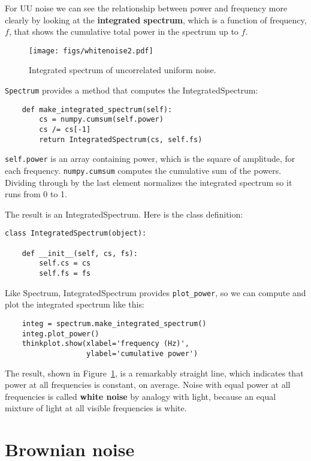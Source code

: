 \documentclass[12pt]{book}
\begin{document}
For UU noise we can see the relationship between power and frequency
more clearly by looking at the {\bf integrated spectrum}, which
is a function of frequency, $f$, that shows the cumulative total power in
the spectrum up to $f$.

\begin{figure}
\centerline{\texttt{[image: figs/whitenoise2.pdf]}}
\caption{Integrated spectrum of uncorrelated uniform noise.}
\label{fig.whitenoise2}
\end{figure}


{\tt Spectrum} provides a method that computes the IntegratedSpectrum:

\begin{verbatim}
    def make_integrated_spectrum(self):
        cs = numpy.cumsum(self.power)
        cs /= cs[-1]
        return IntegratedSpectrum(cs, self.fs)
\end{verbatim}

{\tt self.power} is an array containing power, which is the square
of amplitude, for each frequency.
{\tt numpy.cumsum} computes the cumulative sum of the powers.
Dividing through by the last element normalizes the integrated
spectrum so it runs from 0 to 1.

The result is an IntegratedSpectrum.  Here is the class definition:

\begin{verbatim}
class IntegratedSpectrum(object):
    
    def __init__(self, cs, fs):
        self.cs = cs
        self.fs = fs
\end{verbatim}

Like Spectrum, IntegratedSpectrum provides \verb"plot_power", so
we can compute and plot the integrated spectrum like this:

\begin{verbatim}
    integ = spectrum.make_integrated_spectrum()
    integ.plot_power()
    thinkplot.show(xlabel='frequency (Hz)',
                   ylabel='cumulative power')
\end{verbatim}

The result, shown in Figure~\ref{fig.whitenoise2}, is a remarkably
straight line, which indicates that power at all
frequencies is constant, on average.  Noise with equal power
at all frequencies is called {\bf white noise} by analogy with light,
because an equal mixture
of light at all visible frequencies is white.



\section{Brownian noise}
\end{document}
